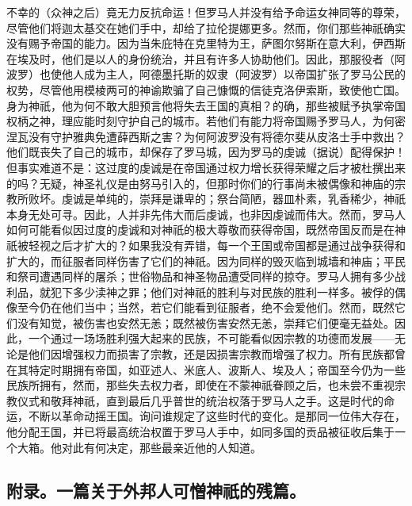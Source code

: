 不幸的（众神之后）竟无力反抗命运！但罗马人并没有给予命运女神同等的尊荣，尽管他们将迦太基交在她们手中，却给了拉伦提娜更多。然而，你们那些神祇确实没有赐予帝国的能力。因为当朱庇特在克里特为王，萨图尔努斯在意大利，伊西斯在埃及时，他们是以人的身份统治，并且有许多人协助他们。因此，那服役者（阿波罗）也使他人成为主人，阿德墨托斯的奴隶（阿波罗）以帝国扩张了罗马公民的权势，尽管他用模棱两可的神谕欺骗了自己慷慨的信徒克洛伊索斯，致使他亡国。身为神祇，他为何不敢大胆预言他将失去王国的真相？的确，那些被赋予执掌帝国权柄之神，理应能时刻守护自己的城市。若他们有能力将帝国赐予罗马人，为何密涅瓦没有守护雅典免遭薛西斯之害？为何阿波罗没有将德尔斐从皮洛士手中救出？他们既丧失了自己的城市，却保存了罗马城，因为罗马的虔诚（据说）配得保护！但事实难道不是：这过度的虔诚是在帝国通过权力增长获得荣耀之后才被杜撰出来的吗？无疑，神圣礼仪是由努马引入的，但那时你们的行事尚未被偶像和神庙的宗教所败坏。虔诚是单纯的，崇拜是谦卑的；祭台简陋，器皿朴素，乳香稀少，神祇本身无处可寻。因此，人并非先伟大而后虔诚，也非因虔诚而伟大。然而，罗马人如何可能看似因过度的虔诚和对神祇的极大尊敬而获得帝国，既然帝国反而是在神祇被轻视之后才扩大的？如果我没有弄错，每一个王国或帝国都是通过战争获得和扩大的，而征服者同样伤害了它们的神祇。因为同样的毁灭临到城墙和神庙；平民和祭司遭遇同样的屠杀；世俗物品和神圣物品遭受同样的掠夺。罗马人拥有多少战利品，就犯下多少渎神之罪；他们对神祇的胜利与对民族的胜利一样多。被俘的偶像至今仍在他们当中；当然，若它们能看到征服者，绝不会爱他们。然而，既然它们没有知觉，被伤害也安然无恙；既然被伤害安然无恙，崇拜它们便毫无益处。因此，一个通过一场场胜利强大起来的民族，不可能看似因宗教的功德而发展——无论是他们因增强权力而损害了宗教，还是因损害宗教而增强了权力。所有民族都曾在其特定时期拥有帝国，如亚述人、米底人、波斯人、埃及人；帝国至今仍为一些民族所拥有，然而，那些失去权力者，即使在不蒙神祇眷顾之后，也未尝不重视宗教仪式和敬拜神祇，直到最后几乎普世的统治权落于罗马人之手。这是时代的命运，不断以革命动摇王国。询问谁规定了这些时代的变化。是那同一位伟大存在，他分配王国，并已将最高统治权置于罗马人手中，如同多国的贡品被征收后集于一个大箱。他对此有何决定，那些最亲近他的人知道。\par


\subsection{附录。一篇关于外邦人可憎神祇的残篇。}

\par

